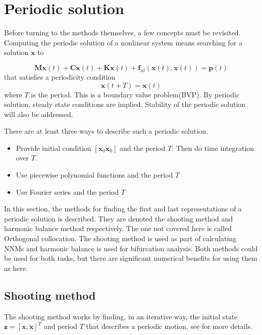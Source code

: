 

\section{Periodic solution}
\label{sec:periodic-solution}

Before turning to the methods themselves, a few concepts must be revisited.
Computing the periodic solution of a nonlinear system means searching for a
solution $\bm x$ to

\begin{equation}
    \label{eq:per_eom}
  \bm M \ddot{\bm x}(t) + \bm C \dot{\bm x}(t) + \bm K \bm x(t) +
  \bm f_{nl} \left( \bm x(t), \dot{ \bm x}(t) \right) = \bm p (t)
\end{equation}
that satisfies a periodicity condition
\begin{equation}
  \label{eq:per_condtion}
  \bm x(t+T) = \bm x(t)
\end{equation}
where $T$ is the period. This is a boundary value problem(BVP). By periodic
solution, steady state conditions are implied. Stability of the periodic
solution will also be addressed.


There are at least three ways to describe such a periodic solution.

\begin{itemize}
\item Provide initial condition $\left[\bm x_0 \dot{\bm x}_0 \right]$ and the
  period $T$. Then do time integration over $T$.
\item Use piecewise polynomial functions and the period $T$
\item Use Fourier series and the period $T$
\end{itemize}

In this section, the methods for finding the first and last representations of a
periodic solution is described. They are denoted the shooting method and
harmonic balance method respectively. The one not covered here is called
Orthogonal collocation. The shooting method is used as part of calculating NNMs
and harmonic balance is used for bifurcation analysis. Both methods could be
used for both tasks, but there are significant numerical benefits for using them
as here.


\subsection{Shooting method}
\label{sec:shooting_method}

The shooting method works by finding, in an iterative way, the initial state
$\bm z = [\bm x, \dot{\bm x}]^T$ and period $T$ that describes a periodic
motion, see \citet{nayfeh2008applied} for more details.

